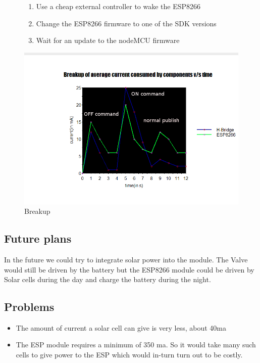 \documentclass[16pt]{article}
\begin{document}
\begin{figure}
\begin{enumerate}

\item
  Use a cheap external controller to wake the ESP8266
\item
  Change the ESP8266 firmware to one of the SDK versions
\item
  Wait for an update to the nodeMCU firmware
\end{enumerate}
\includegraphics[width=1.2\textwidth]{images/breakup1.png}
\caption{Breakup}
\end{figure}
  



\vspace{0.5cm}
\subsection{Future plans}

\vspace{0.3cm}
In the future we could try to integrate solar power into the module. The
Valve would still be driven by the battery but the ESP8266 module could
be driven by Solar cells during the day and charge the battery during
the night.

\vspace{0.3cm}

\subsection{Problems}

\begin{itemize}

\item
  The amount of current a solar cell can give is very less, about 40ma
\item
  The ESP module requires a minimum of 350 ma. So it would take many
  such cells to give power to the ESP which would in-turn turn out to be
  costly.
\end{itemize}
\end{document}
